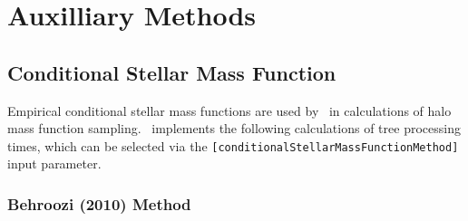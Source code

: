 \chapter{Auxilliary Methods}

\section{Conditional Stellar Mass Function}

Empirical conditional stellar mass functions are used by \glc\ in calculations of halo mass function sampling. \glc\ implements the following calculations of tree processing times, which can be selected via the {\tt [conditionalStellarMassFunctionMethod]} input parameter.

\subsection{Behroozi (2010) Method}

